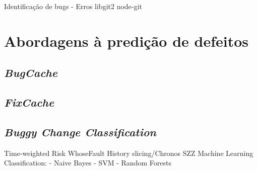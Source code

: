 Identificação de bugs - Erros
libgit2
node-git

\section{Abordagens à predição de defeitos}


\subsection{\emph{BugCache}}

\subsection{\emph{FixCache}}

\subsection{\emph{Buggy Change Classification}}


Time-weighted Risk
WhoseFault
History slicing/Chronos
SZZ
Machine Learning Classification:
- Naive Bayes
- SVM
- Random Forests